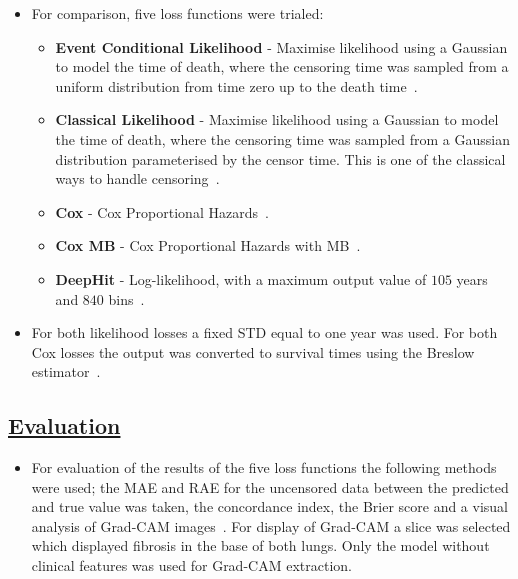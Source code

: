 \documentclass[portrait, color=UCLburgundy, margin=1cm]{uclposter}
\begin{document}
\begin{multicols}{2}
\begin{itemize}
                    \item For comparison, five loss functions were trialed:
            
                    \begin{itemize}
                        \item \textbf{Event Conditional Likelihood} - Maximise likelihood using a Gaussian to model the time of death, where the censoring time was sampled from a uniform distribution from time zero up to the death time~\cite{Shahin2023DeepAnalysis}.
            
                        \item \textbf{Classical Likelihood} - Maximise likelihood using a Gaussian to model the time of death, where the censoring time was sampled from a Gaussian distribution parameterised by the censor time. This is one of the classical ways to handle censoring~\cite{Lee2018DeepHit:Risks}.
            
                        \item \textbf{Cox} - Cox Proportional Hazards~\cite{Cox1972RegressionLife-Tables}.
            
                        \item \textbf{Cox \gls{MB}} - Cox Proportional Hazards with \gls{MB}~\cite{Shahin2022SurvivalData}.
            
                        \item \textbf{DeepHit} - Log-likelihood, with a maximum output value of $105$ years and $840$ bins~\cite{Lee2018DeepHit:Risks}.
                    \end{itemize}
            
                    \item For both likelihood losses a fixed \gls{STD} equal to one year was used. For both Cox losses the output was converted to survival times using the Breslow estimator~\cite{Breslow1974CovarianceData}.
                \end{itemize}
            
            \subsection*{\underline{\textbf{Evaluation}}}
                \begin{itemize}
                    \item For evaluation of the results of the five loss functions the following methods were used; the \gls{MAE} and \gls{RAE} for the uncensored data between the predicted and true value was taken, the concordance index, the Brier score and a visual analysis of Grad-CAM images~\cite{Raykar2008OnIndex, Gerds2006ConsistentTimes, Selvaraju2020Grad-CAM:Localization}. For display of Grad-CAM a slice was selected which displayed fibrosis in the base of both lungs. Only the model without clinical features was used for Grad-CAM extraction.
                \end{itemize}


\end{multicols}
\end{document}
